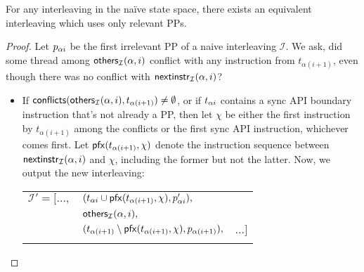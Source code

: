 \begin{lemma}
	For any interleaving in the na\"{i}ve state space, there exists an equivalent interleaving which uses only relevant PPs.
	\label{lem:equivalent}
\end{lemma}

\begin{proof}
	Let $p_{\alpha{}i}$ be the first irrelevant PP of a naive interleaving $\mathcal{I}$.
	We ask, did some thread among $\mathsf{others}_{\mathcal{I}}(\alpha,i)$ conflict with any instruction from $t_{\alpha{}(i+1)}$, even though there was no conflict with $\mathsf{nextinstr}_{\mathcal{I}}(\alpha,i)$?
	\begin{itemize}
		\item If $\mathsf{conflicts}(\mathsf{others}_{\mathcal{I}}(\alpha,i),t_{\alpha{}(i+1)}) \ne \emptyset$, or if $t_{\alpha{}i}$ contains a sync API boundary instruction that's not already a PP,
			then let $\chi$ be either the first instruction by $t_{\alpha{}(i+1)}$ among the conflicts or the first sync API instruction, whichever comes first.
			Let $\mathsf{pfx}(t_{\alpha{}(i+1)},\chi)$ denote the instruction sequence between $\mathsf{nextinstr}_{\mathcal{I}}(\alpha,i)$ and $\chi$, including the former but not the latter.
			Now, we output the new interleaving:

			\begin{tabular}{lll}
				\\
				$\mathcal{I}' = [...,$&$(t_{\alpha{}i} \cup \mathsf{pfx}(t_{\alpha{}(i+1)},\chi), p_{\alpha{}i}'),$& \\
																		 &$\mathsf{others}_{\mathcal{I}}(\alpha,i),$& \\
						       &$(t_{\alpha{}(i+1)} \setminus \mathsf{pfx}(t_{\alpha{}(i+1)},\chi), p_{\alpha{}(i+1)}),$ & $ ...]$ \\
				\\
			\end{tabular}


\end{itemize}
\end{proof}

